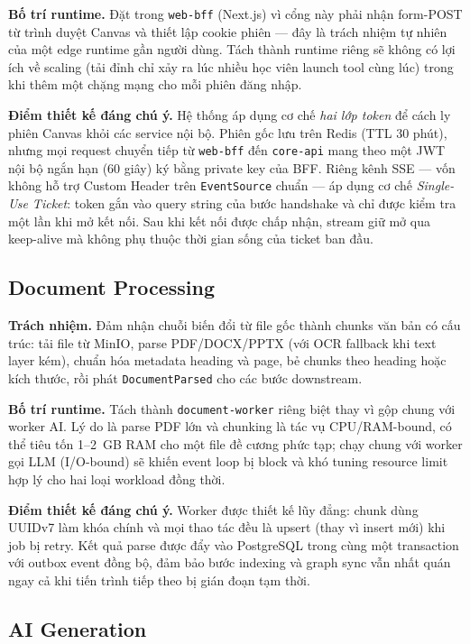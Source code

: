 \textbf{Bố trí runtime.} Đặt trong \texttt{web-bff} (Next.js) vì cổng này
phải nhận form-POST từ trình duyệt Canvas và thiết lập cookie phiên ---
đây là trách nhiệm tự nhiên của một edge runtime gần người dùng. Tách thành
runtime riêng sẽ không có lợi ích về scaling (tải đỉnh chỉ xảy ra lúc nhiều
học viên launch tool cùng lúc) trong khi thêm một chặng mạng cho mỗi phiên
đăng nhập.

\textbf{Điểm thiết kế đáng chú ý.} Hệ thống áp dụng cơ chế \emph{hai lớp
token} để cách ly phiên Canvas khỏi các service nội bộ. Phiên gốc lưu trên
Redis (TTL 30 phút), nhưng mọi request chuyển tiếp từ \texttt{web-bff} đến
\texttt{core-api} mang theo một JWT nội bộ ngắn hạn (60 giây) ký bằng
private key của BFF. Riêng kênh SSE --- vốn không hỗ trợ Custom Header
trên \texttt{EventSource} chuẩn --- áp dụng cơ chế \emph{Single-Use Ticket}:
token gắn vào query string của bước handshake và chỉ được kiểm tra một lần
khi mở kết nối. Sau khi kết nối được chấp nhận, stream giữ mở qua
keep-alive mà không phụ thuộc thời gian sống của ticket ban đầu.

\subsection{Document Processing}

\textbf{Trách nhiệm.} Đảm nhận chuỗi biến đổi từ file gốc thành chunks văn
bản có cấu trúc: tải file từ MinIO, parse PDF/DOCX/PPTX (với OCR fallback
khi text layer kém), chuẩn hóa metadata heading và page, bẻ chunks theo
heading hoặc kích thước, rồi phát \texttt{DocumentParsed} cho các bước
downstream.

\textbf{Bố trí runtime.} Tách thành \texttt{document-worker} riêng biệt
thay vì gộp chung với worker AI. Lý do là parse PDF lớn và chunking là
tác vụ CPU/RAM-bound, có thể tiêu tốn 1--2~GB RAM cho một file đề cương
phức tạp; chạy chung với worker gọi LLM (I/O-bound) sẽ khiến event loop
bị block và khó tuning resource limit hợp lý cho hai loại workload đồng
thời.

\textbf{Điểm thiết kế đáng chú ý.} Worker được thiết kế lũy đẳng: chunk
dùng UUIDv7 làm khóa chính và mọi thao tác đều là upsert (thay vì insert
mới) khi job bị retry. Kết quả parse được đẩy vào PostgreSQL trong cùng
một transaction với outbox event đồng bộ, đảm bảo bước indexing và graph
sync vẫn nhất quán ngay cả khi tiến trình tiếp theo bị gián đoạn tạm thời.

\subsection{AI Generation}

